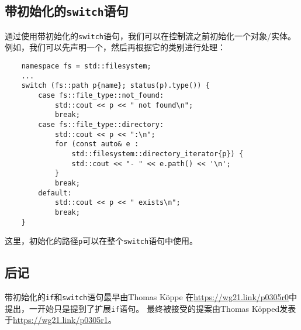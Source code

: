\subsection{带初始化的\texttt{switch}语句}
通过使用带初始化的\texttt{switch}语句，我们可以在控制流之前初始化一个对象/实体。
例如，我们可以先声明一个，然后再根据它的类别进行处理：
\begin{lstlisting}
    namespace fs = std::filesystem;
    ...
    switch (fs::path p{name}; status(p).type()) {
        case fs::file_type::not_found:
            std::cout << p << " not found\n";
            break;
        case fs::file_type::directory:
            std::cout << p << ":\n";
            for (const auto& e :
                std::filesystem::directory_iterator{p}) {
                std::cout << "- " << e.path() << '\n';
            }
            break;
        default:
            std::cout << p << " exists\n";
            break;
    }
\end{lstlisting}
这里，初始化的路径\texttt{p}可以在整个\texttt{switch}语句中使用。

\subsection{后记}
带初始化的\texttt{if}和\texttt{switch}语句最早由Thomas Köppe
在\url{https://wg21.link/p0305r0}中提出，一开始只是提到了扩展\texttt{if}语句。
最终被接受的提案由Thomas Köpped发表于\url{https://wg21.link/p0305r1}。

\setcounter{footnote}{0}
